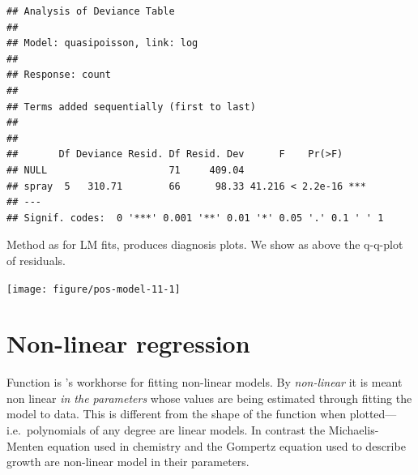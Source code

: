\documentclass[krantz2]{krantz}\usepackage{knitr}%
\begin{document}
\begin{knitrout}\footnotesize
{}\color{fgcolor}\begin{kframe}
\begin{alltt}
  \hlstd{=} \hlstd{)}
\end{alltt}
\begin{verbatim}
## Analysis of Deviance Table
## 
## Model: quasipoisson, link: log
## 
## Response: count
## 
## Terms added sequentially (first to last)
## 
## 
##       Df Deviance Resid. Df Resid. Dev      F    Pr(>F)    
## NULL                     71     409.04                     
## spray  5   310.71        66      98.33 41.216 < 2.2e-16 ***
## ---
## Signif. codes:  0 '***' 0.001 '**' 0.01 '*' 0.05 '.' 0.1 ' ' 1
\end{verbatim}
\end{kframe}
\end{knitrout}

Method  as for LM fits, produces diagnosis plots. We show as above the q-q-plot of residuals.

\begin{knitrout}\footnotesize
{}\color{fgcolor}\begin{kframe}
\begin{alltt}
  \hlstd{=} \hlstd{)}
\end{alltt}
\end{kframe}

{\centering \texttt{[image: figure/pos-model-11-1]} 

}



\end{knitrout}

\section{Non-linear regression}\label{sec:stat:NLS}

Function  is \Rlang's workhorse for fitting non-linear models. By \emph{non-linear} it is meant non linear \emph{in the parameters} whose values are being estimated through fitting the model to data. This is different from the shape of the function when plotted---i.e.\ polynomials of any degree are linear models. In contrast the Michaelis-Menten equation used in chemistry and the  Gompertz equation used to describe growth are non-linear model in their parameters.
\end{document}
